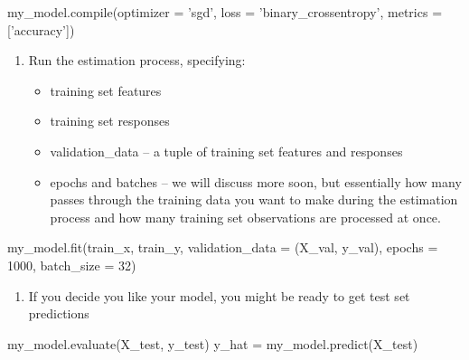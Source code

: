 \documentclass[]{extarticle}
\newenvironment{Shaded}{\begin{snugshade}}{\end{snugshade}}
\newcommand{\BuiltInTok}[1]{\textcolor[rgb]{0.80,0.80,0.80}{#1}}
\newcommand{\DecValTok}[1]{\textcolor[rgb]{0.86,0.86,0.80}{#1}}
\newcommand{\NormalTok}[1]{\textcolor[rgb]{0.80,0.80,0.80}{#1}}
\newcommand{\OperatorTok}[1]{\textcolor[rgb]{0.94,0.94,0.82}{#1}}
\newcommand{\StringTok}[1]{\textcolor[rgb]{0.80,0.58,0.58}{#1}}
\providecommand{\tightlist}{%
  \setlength{\itemsep}{0pt}\setlength{\parskip}{0pt}}
\begin{document}
\begin{Shaded}
\begin{Highlighting}[]
\NormalTok{my_model.}\BuiltInTok{compile}\NormalTok{(optimizer }\OperatorTok{=} \StringTok{'sgd'}\NormalTok{, loss }\OperatorTok{=} \StringTok{'binary_crossentropy'}\NormalTok{, metrics }\OperatorTok{=}\NormalTok{ [}\StringTok{'accuracy'}\NormalTok{])}
\end{Highlighting}
\end{Shaded}

\begin{enumerate}
\def\labelenumi{\arabic{enumi}.}
\setcounter{enumi}{3}
\tightlist
\item
  Run the estimation process, specifying:

  \begin{itemize}
  \tightlist
  \item
    training set features
  \item
    training set responses
  \item
    validation\_data -- a tuple of training set features and responses
  \item
    epochs and batches -- we will discuss more soon, but essentially how
    many passes through the training data you want to make during the
    estimation process and how many training set observations are
    processed at once.
  \end{itemize}
\end{enumerate}

\begin{Shaded}
\begin{Highlighting}[]
\NormalTok{my_model.fit(train_x, train_y,}
\NormalTok{  validation_data }\OperatorTok{=}\NormalTok{ (X_val, y_val),}
\NormalTok{  epochs }\OperatorTok{=} \DecValTok{1000}\NormalTok{, batch_size }\OperatorTok{=} \DecValTok{32}\NormalTok{)}
\end{Highlighting}
\end{Shaded}

\begin{enumerate}
\def\labelenumi{\arabic{enumi}.}
\setcounter{enumi}{4}
\tightlist
\item
  If you decide you like your model, you might be ready to get test set
  predictions
\end{enumerate}

\begin{Shaded}
\begin{Highlighting}[]
\NormalTok{my_model.evaluate(X_test, y_test)}
\NormalTok{y_hat }\OperatorTok{=}\NormalTok{ my_model.predict(X_test)}
\end{Highlighting}
\end{Shaded}
\end{document}
